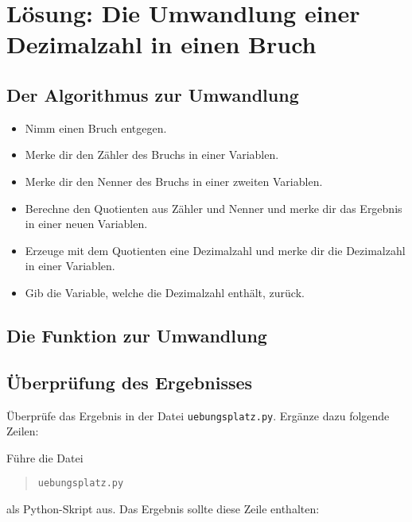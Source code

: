 \section{Lösung: Die Umwandlung einer Dezimalzahl in einen Bruch}

\subsection*{Der Algorithmus zur Umwandlung}

\begin{itemize}
	\item Nimm einen Bruch entgegen.
	\item Merke dir den Zähler des Bruchs in einer Variablen.
	\item Merke dir den Nenner des Bruchs in einer zweiten Variablen.
	\item Berechne den Quotienten aus Zähler und Nenner und merke dir das Ergebnis in einer neuen Variablen. 
	\item Erzeuge mit dem Quotienten eine Dezimalzahl und merke dir die Dezimalzahl in einer Variablen.
	\item Gib die Variable, welche die Dezimalzahl enthält, zurück.
\end{itemize}

\subsection*{Die Funktion zur Umwandlung}

\begin{codePython}
\end{codePython}

\subsection*{Überprüfung des Ergebnisses}

Überprüfe das Ergebnis in der Datei \texttt{uebungsplatz.py}. Ergänze dazu folgende Zeilen:

\begin{codePython}
\end{codePython}

Führe die Datei
\begin{quote}
	\texttt{uebungsplatz.py}
\end{quote}
als Python-Skript aus. Das Ergebnis sollte diese Zeile enthalten:
\begin{quote}
\end{quote} 

